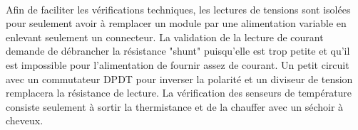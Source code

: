 	\paragraph*{}
	Afin de faciliter les vérifications techniques, les lectures de tensions sont isolées pour seulement avoir à remplacer un module par une alimentation variable en enlevant seulement un connecteur. La validation de la lecture de courant demande de débrancher la résistance "shunt" puisqu'elle est trop petite et qu'il est impossible pour l'alimentation de fournir assez de courant. Un petit circuit avec un commutateur DPDT pour inverser la polarité et un diviseur de tension remplacera la résistance de lecture. La vérification des senseurs de température consiste seulement à sortir la thermistance et de la chauffer avec un séchoir à cheveux. 